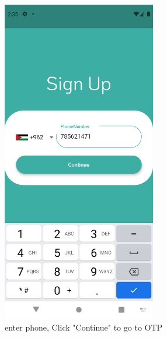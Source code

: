 \documentclass[12pt]{article}
\begin{document}
\begin{figure}[h!]
\centerline{\includegraphics[width=0.6\textwidth]{./Screenshots/7.PNG}}
  \caption{enter phone, Click "Continue" to go to OTP}
  \end{figure}
\end{document}
